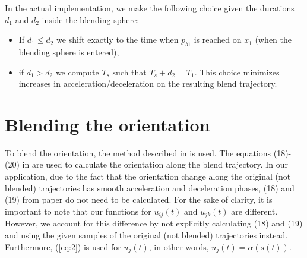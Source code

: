 \documentclass{article}
\begin{document}
In the actual implementation, we make the following choice given the durations $d_1$ and $d_2$ inside the blending sphere:
\begin{itemize}
\item If $d_1\leq d_2$ we shift exactly to the time when $p_{b1}$ is reached on $x_1$ (when the blending sphere is entered),
\item if $d_1>d_2$ we compute $T_s$ such that $T_s+d_2=T_1$. This choice minimizes increases in acceleration/deceleration on the resulting blend trajectory.
\end{itemize}


\section{Blending the orientation}
To blend the orientation, the method described in \cite{dantam2014orientation} is used. The equations (18)-(20) in \cite{dantam2014orientation} are used to calculate the orientation along the blend trajectory. In our application, due to the fact that the orientation change along the original (not blended) trajectories has smooth acceleration and deceleration phases, (18) and (19) from paper \cite{dantam2014orientation} do not need to be calculated.\newline
For the sake of clarity, it is important to note that our functions for $u_{ij}(t)$ and $u_{jk}(t)$ are different. However, we account for this difference by not explicitly calculating (18) and (19) and using the given samples of the original (not blended) trajectories instead. Furthermore,  (\ref{eq:2}) is used for $u_{j}(t)$, in other words, $u_{j}(t) = \alpha(s(t))$.
\end{document}
